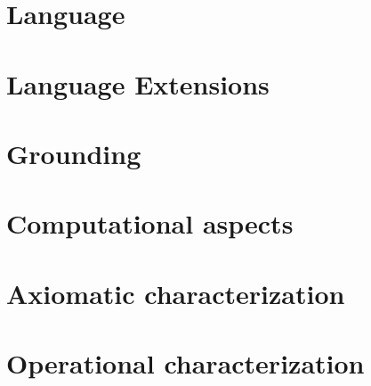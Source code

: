 \documentclass{article}
\begin{document}
\section{Language}

\begin{refsection}
  \nocite{gekakasc12a}
  \nocite{PotasscoUserGuide19}
  \nocite{cafageiakakrlemarisc20a}
  \printbibliography[heading=subbibliography]
\end{refsection}

\section{Language Extensions}

\begin{refsection}
  \nocite{gekakasc12a}
  \printbibliography[heading=subbibliography]
\end{refsection}

\section{Grounding}

\begin{refsection}
  \nocite{gekakasc12a}
  \nocite{gekasc15a}
  \nocite{abhuvi95a}
  \printbibliography[heading=subbibliography]
\end{refsection}

\section{Computational aspects}

\begin{refsection}
  \nocite{gekakasc12a}
  \printbibliography[heading=subbibliography]
\end{refsection}

\section{Axiomatic characterization}

\begin{refsection}
  \nocite{gekakasc12a}
  \nocite{lifschitz08a,lifschitz10a}
  \printbibliography[heading=subbibliography]
\end{refsection}

\section{Operational characterization}
\end{document}
